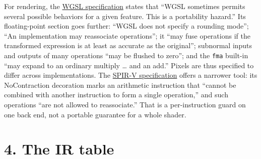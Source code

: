 \documentclass[10pt,letterpaper]{article}
\begin{document}
For rendering, the \href{https://www.w3.org/TR/WGSL/}{WGSL
specification} states that ``WGSL sometimes permits several possible
behaviors for a given feature. This is a portability hazard.'' Its
floating-point section goes further: ``WGSL does not specify a rounding
mode''; ``An implementation may reassociate operations''; it ``may fuse
operations if the transformed expression is at least as accurate as the
original''; subnormal inputs and outputs of many operations ``may be
flushed to zero''; and the \texttt{fma} built-in ``may expand to an
ordinary multiply \ldots{} and an add.'' Pixels are thus specified to
differ across implementations. The
\href{https://registry.khronos.org/SPIR-V/specs/unified1/SPIRV.html}{SPIR-V
specification} offers a narrower tool: its NoContraction decoration
marks an arithmetic instruction that ``cannot be combined with another
instruction to form a single operation,'' and such operations ``are not
allowed to reassociate.'' That is a per-instruction guard on one back
end, not a portable guarantee for a whole shader.

\section{4. The IR table}\label{the-ir-table}
\end{document}
